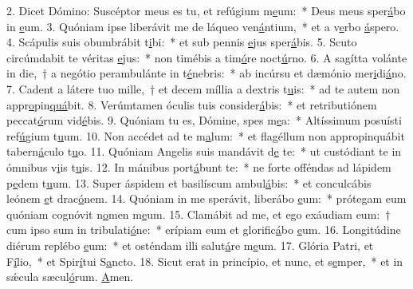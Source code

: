 2. Dicet Dómino: Suscéptor meus es tu, et refúgium m\uline{e}um:~* Deus meus sper\uline{á}bo in \uline{e}um.
3. Quóniam ipse liberávit me de láqueo ven\uline{á}ntium,~* et a v\uline{e}rbo \uline{á}spero.
4. Scápulis suis obumbrábit t\uline{i}bi:~* et sub pennis \uline{e}jus sper\uline{á}bis.
5. Scuto circúmdabit te véritas \uline{e}jus:~* non timébis a tim\uline{ó}re noct\uline{ú}rno.
6. A sagítta volánte in die,~† a negótio perambulánte in t\uline{é}nebris:~* ab incúrsu et dæmónio mer\uline{i}di\uline{á}no.
7. Cadent a látere tuo mille,~† et decem míllia a dextris t\uline{u}is:~* ad te autem non appr\uline{o}pin\uline{quá}bit.
8. Verúmtamen óculis tuis consider\uline{á}bis:~* et retributiónem peccat\uline{ó}rum vid\uline{é}bis.
9. Quóniam tu es, Dómine, spes m\uline{e}a:~* Altíssimum posuísti ref\uline{ú}gium t\uline{u}um.
10. Non accédet ad te m\uline{a}lum:~* et flagéllum non appropinquábit tabern\uline{á}culo t\uline{u}o.
11. Quóniam Angelis suis mandávit d\uline{e} te:~* ut custódiant te in ómnibus v\uline{i}is t\uline{u}is.
12. In mánibus port\uline{á}bunt te:~* ne forte offéndas ad lápidem p\uline{e}dem t\uline{u}um.
13. Super áspidem et basilíscum ambul\uline{á}bis:~* et conculcábis leónem \uline{e}t drac\uline{ó}nem.
14. Quóniam in me sperávit, liberábo \uline{e}um:~* prótegam eum quóniam cognóvit n\uline{o}men m\uline{e}um.
15. Clamábit ad me, et ego exáudiam eum:~† cum ipso sum in tribulati\uline{ó}ne:~* erípiam eum et glorific\uline{á}bo \uline{e}um.
16. Longitúdine diérum replébo \uline{e}um:~* et osténdam illi salut\uline{á}re m\uline{e}um.
17. Glória Patri, et F\uline{í}lio,~* et Spir\uline{í}tui S\uline{a}ncto.
18. Sicut erat in princípio, et nunc, et s\uline{e}mper,~* et in sǽcula sæcul\uline{ó}rum. \uline{A}men.
